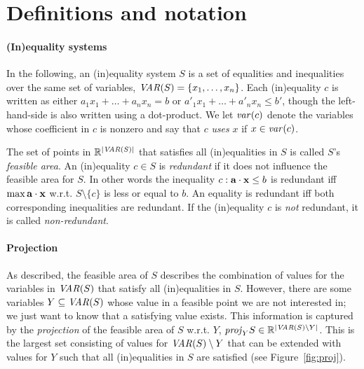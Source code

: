 %
%
\section{Definitions and notation}
\paragraph{(In)equality systems}
In the following, an (in)equality system $S$ is a set of equalities and inequalities over the same set of variables, $\mathit{VAR}(S)=\{x_1,\ldots, x_n\}$. 
Each (in)equality $c$ is written as either $a_1x_1 + \ldots +a_nx_n = b$ or $a'_1x_1 + \ldots +a'_nx_n\leq b'$, though the left-hand-side is also written using a dot-product. 
%
We let $\mathit{var}(c)$ denote the variables whose coefficient in $c$ is nonzero and say that $c$ \emph{uses} $x$ if $x\in \mathit{var}(c)$.

The set of points in $\mathbb{R}^{|\mathit{VAR}(S)|}$ that satisfies all (in)equalities in $S$ is called $S$'s \emph{feasible area}.
%
An (in)equality $c\in S$ is \emph{redundant} if it does not influence the feasible area for $S$. In other words the inequality $c: \mathbf{a}\cdot\mathbf{x}\leq b$ is redundant iff $\max \mathbf{a}\cdot\mathbf{x}$ w.r.t. $S\setminus\{c\}$ is less or equal to $b$.
An equality is redundant iff both corresponding inequalities are redundant.
If the (in)equality $c$ is \emph{not} redundant, it is called \emph{non-redundant}.

\paragraph{Projection}
As described, the feasible area of $S$ describes the combination of values for the variables in $\mathit{VAR}(S)$ that satisfy all (in)equalities in $S$. However, there are some variables $Y\subseteq \mathit{VAR}(S)$ whose value in a feasible point we are not interested in; we just want to know that a satisfying value exists. This information is captured by the \emph{projection} of the feasible area of $S$ w.r.t. $Y$, $\mathit{proj}_YS\in\mathbb{R}^{|\mathit{VAR}(S)\setminus Y|}$. This is the largest set consisting of values for $\mathit{VAR}(S)\setminus Y$ that can be extended with values for $Y$ such that all (in)equalities in $S$ are satisfied (see Figure~\ref{fig:proj}). 


